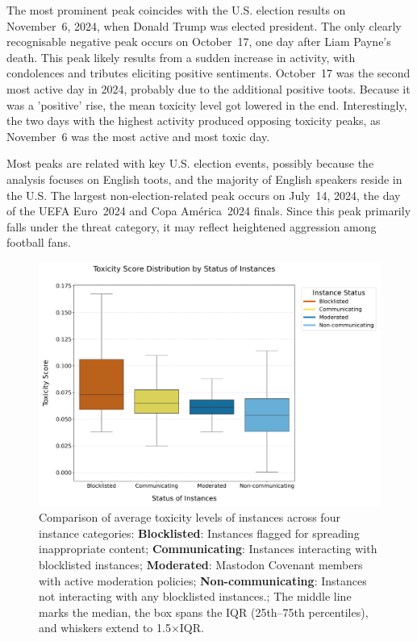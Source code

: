 The most prominent peak coincides with the U.S. election results on November~6, 2024, when Donald Trump was elected president. The only clearly recognisable negative peak occurs on October~17, one day after Liam Payne's death. This peak likely results from a sudden increase in activity, with condolences and tributes eliciting positive sentiments. October~17 was the second most active day in 2024, probably due to the additional positive toots. Because it was a 'positive' rise, the mean toxicity level got lowered in the end. Interestingly, the two days with the highest activity produced opposing toxicity peaks, as November~6 was the most active and most toxic day. 

Most peaks are related with key U.S. election events, possibly because the analysis focuses on English toots, and the majority of English speakers reside in the U.S. The largest non-election-related peak occurs on July~14, 2024, the day of the UEFA Euro~2024 and Copa América~2024 finals. Since this peak primarily falls under the threat category, it may reflect heightened aggression among football fans.

\begin{figure}[tb]
    \centering
    \includegraphics[width=\textwidth]{../material/blocklist_vs_covenant_boxplot.png}
    \caption{Comparison of average toxicity levels of instances across four instance categories: 
    \textbf{Blocklisted}: Instances flagged for spreading inappropriate content; 
    \textbf{Communicating}: Instances interacting with blocklisted instances; 
    \textbf{Moderated}: Mastodon Covenant members with active moderation policies;
    \textbf{Non-communicating}: Instances not interacting with any blocklisted instances.;
    The middle line marks the median, the box spans the IQR (25th–75th percentiles), and whiskers extend to 1.5×IQR.}
    \label{blocklisted-vs-covenant}
\end{figure}

